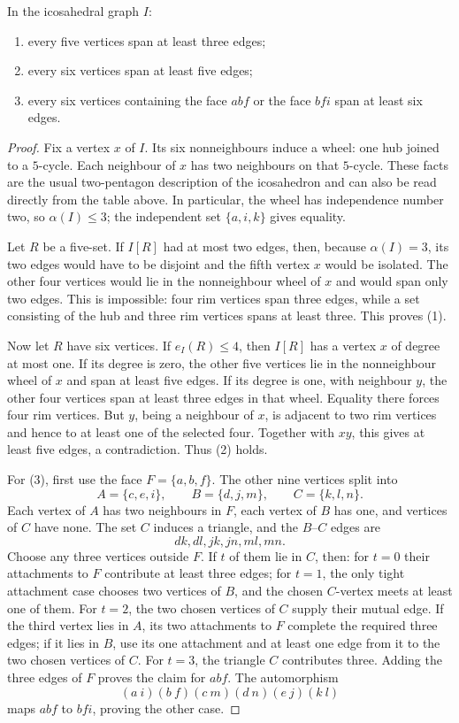 \documentclass[10pt,a4paper]{amsart}
\begin{document}
\begin{lemma}\label{lem:ico}
In the icosahedral graph $I$:
\begin{enumerate}
\item every five vertices span at least three edges;
\item every six vertices span at least five edges;
\item every six vertices containing the face $abf$ or the face $bfi$ span
      at least six edges.
\end{enumerate}
\end{lemma}

\begin{proof}
Fix a vertex $x$ of $I$.  Its six nonneighbours induce a wheel: one hub
joined to a $5$-cycle.  Each neighbour of $x$ has two neighbours on that
$5$-cycle.  These facts are the usual two-pentagon description of the
icosahedron and can also be read directly from the table above.  In
particular, the wheel has independence number two, so $\alpha(I)\le3$;
the independent set $\{a,i,k\}$ gives equality.

Let $R$ be a five-set.  If $I[R]$ had at most two edges, then, because
$\alpha(I)=3$, its two edges would have to be disjoint and the fifth vertex
$x$ would be isolated.  The other four vertices would lie in the
nonneighbour wheel of $x$ and would span only two edges.  This is impossible:
four rim vertices span three edges, while a set consisting of the hub and
three rim vertices spans at least three.  This proves (1).

Now let $R$ have six vertices.  If $e_I(R)\le4$, then $I[R]$ has a vertex
$x$ of degree at most one.  If its degree is zero, the other five vertices
lie in the nonneighbour wheel of $x$ and span at least five edges.  If its
degree is one, with neighbour $y$, the other four vertices span at least
three edges in that wheel.  Equality there forces four rim vertices.  But
$y$, being a neighbour of $x$, is adjacent to two rim vertices and hence to
at least one of the selected four.  Together with $xy$, this gives at least
five edges, a contradiction.  Thus (2) holds.

For (3), first use the face $F=\{a,b,f\}$.  The other nine vertices split
into
\[
 A=\{c,e,i\},\qquad B=\{d,j,m\},\qquad C=\{k,l,n\}.
\]
Each vertex of $A$ has two neighbours in $F$, each vertex of $B$ has one,
and vertices of $C$ have none.  The set $C$ induces a triangle, and the
$B$--$C$ edges are
\[
 dk,dl,jk,jn,ml,mn.
\]
Choose any three vertices outside $F$.  If $t$ of them lie in $C$, then:
for $t=0$ their attachments to $F$ contribute at least three edges; for
 $t=1$, the only tight attachment case chooses two vertices of $B$, and the
 chosen $C$-vertex meets at least one of them.  For $t=2$, the two chosen
 vertices of $C$ supply their mutual edge.  If the third vertex lies in $A$,
 its two attachments to $F$ complete the required three edges; if it lies in
 $B$, use its one attachment and at least one edge from it to the two chosen
 vertices of $C$.  For $t=3$, the triangle $C$ contributes three.  Adding the
 three edges of $F$ proves the claim for $abf$.  The automorphism
\[
 (a\ i)(b\ f)(c\ m)(d\ n)(e\ j)(k\ l)
\]
maps $abf$ to $bfi$, proving the other case.
\end{proof}
\end{document}
